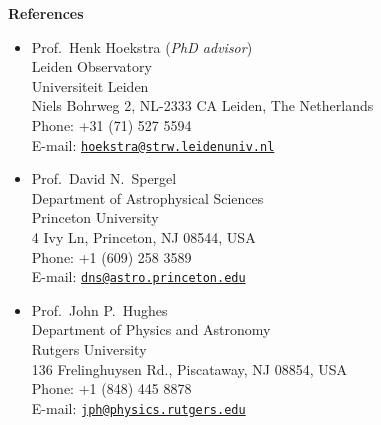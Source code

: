 \documentclass[11pt]{article}
\newcommand\email[1]{\href{mailto:#1}{\texttt{#1}}}
\begin{document}
\noindent
{\bf\Large References}
\begin{itemize}
 \item Prof.~Henk Hoekstra (\textit{PhD advisor})\\
       Leiden Observatory\\
       Universiteit Leiden\\
       Niels Bohrweg 2, NL-2333 CA Leiden, The Netherlands\\
       Phone: +31 (71) 527 5594\\
       E-mail: \email{hoekstra@strw.leidenuniv.nl}
 \item Prof.~David N.~Spergel\\
       Department of Astrophysical Sciences\\
       Princeton University\\
       4 Ivy Ln, Princeton, NJ 08544, USA\\
       Phone: +1 (609) 258 3589\\
       E-mail: \email{dns@astro.princeton.edu}
 \item Prof.~John P.~Hughes\\
       Department of Physics and Astronomy\\
       Rutgers University\\
       136 Frelinghuysen Rd., Piscataway, NJ 08854, USA\\
       Phone: +1 (848) 445 8878\\
       E-mail: \email{jph@physics.rutgers.edu}
\end{itemize}




% 
\end{document}
